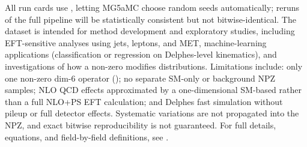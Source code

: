 {}All run cards use , letting MG5\markdownRendererUnderscore{}aMC choose random seeds automatically; reruns of the full pipeline will be statistically consistent but not bitwise-identical.\markdownRendererInterblockSeparator
{}
\markdownRendererSectionEnd \markdownRendererSectionBegin
{}\markdownRendererInterblockSeparator
{}The dataset is intended for method development and exploratory studies, including EFT-sensitive analyses using jets, leptons, and MET, machine-learning applications (classification or regression on Delphes-level kinematics), and investigations of how a non-zero  modifies  distributions.\markdownRendererParagraphSeparator
{}Limitations include: only one non-zero dim-6 operator (); no separate SM-only or background NPZ samples; NLO QCD effects approximated by a one-dimensional SM-based  rather than a full NLO+PS EFT calculation; and Delphes fast simulation without pileup or full detector effects. Systematic variations are not propagated into the NPZ, and exact bitwise reproducibility is not guaranteed. For full details, equations, and field-by-field definitions, see .
\markdownRendererSectionEnd 
\markdownRendererSectionEnd \markdownRendererDocumentEnd